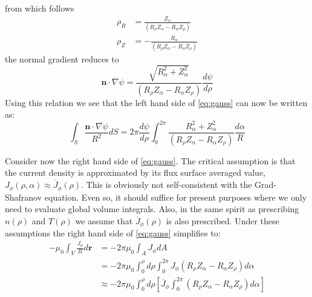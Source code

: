 from which follows
\begin{equation}
	\begin{aligned}
		\rho _ { R } & = \frac { Z _ { \alpha } } { \left( R _ { \rho } Z _ { \alpha } - R _ { \alpha } Z _ { \rho } \right) } \\ \rho _ { Z } & = - \frac { R _ { \alpha } } { \left( R _ { \rho } Z _ { \alpha } - R _ { \alpha } Z _ { \rho } \right) }
	\end{aligned}
\end{equation}
the normal gradient reduces to
\begin{equation}
	\mathbf { n } \cdot \nabla \psi = \frac { \sqrt{ R _ { \alpha } ^ { 2 } + Z _ { \alpha } ^ { 2 } } } { \left( R _ { \rho } Z _ { \alpha } - R _ { \alpha } Z _ { \rho } \right) } \frac { d \psi } { d \rho }
\end{equation}
Using this relation we see that the left hand side of \cref{eq:gauss} can now be written as:
\begin{equation}
	\label{eq:bs_part1}
	\int _ { S } \frac { \mathbf { n } \cdot \nabla \psi } { R ^ { 2 } } d S = 2 \pi \frac { d \psi } { d \rho } \int _ { 0 } ^ { 2 \pi } \frac { R _ { \alpha } ^ { 2 } + Z _ { \alpha } ^ { 2 } } { \left( R _ { \rho } Z _ { \alpha } - R _ { \alpha } Z _ { \rho } \right) } \frac { d \alpha } { R }
\end{equation}

Consider now the right hand side of \cref{eq:gauss}. The critical assumption is that the current density is approximated by its flux surface averaged value, $J _ { \phi } ( \rho , \alpha ) \approx \overline { J } _ { \phi } ( \rho )$. This is obviously not self-consistent with the Grad-Shafranov equation. Even so, it should suffice for present purposes where we only need to evaluate global volume integrals. Also, in the same spirit as prescribing $n(\rho)$ and $T(\rho)$ we assume that $\overline { J } _ { \phi } ( \rho )$ is also prescribed. Under these assumptions the right hand side of \cref{eq:gauss} simplifies to:
\begin{equation}
	\label{eq:bs_part2}
	\begin{aligned} - \mu _ { 0 } \int _ { V } \frac { J _ { \phi } } { R } d \mathbf { r } & = - 2 \pi \mu _ { 0 } \int _ { A } J _ { \phi } d A \\ & = - 2 \pi \mu _ { 0 } \int _ { 0 } ^ { \rho } d \rho \int _ { 0 } ^ { 2 \pi } J _ { \phi } \left( R _ { \rho } Z _ { \alpha } - R _ { \alpha } Z _ { \rho } \right) d \alpha \\ & \approx - 2 \pi \mu _ { 0 } \int _ { 0 } ^ { \rho } d \rho \left[ \overline { J } _ { \phi } \int _ { 0 } ^ { 2 \pi } \left( R _ { \rho } Z _ { \alpha } - R _ { \alpha } Z _ { \rho } \right) d \alpha \right] \end{aligned}
\end{equation}

